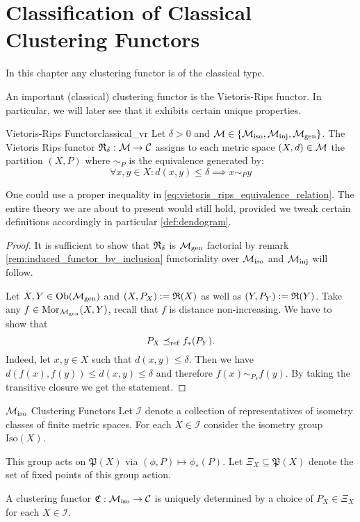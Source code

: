 \chapter{Classification of Classical Clustering Functors}
In this chapter any clustering functor is of the classical type.

An important (classical) clustering functor is the Vietoris-Rips functor.
In particular, we will later see that it exhibits certain unique properties.

\begin{defprop}{Vietoris-Rips Functor}{classical_vr}
    Let $\delta > 0$ and $\mathcal{M} \in \{{\mathcal{M}_\mathrm{iso}}, {\mathcal{M}_\mathrm{inj}}, {\mathcal{M}_\mathrm{gen}}\}$. The Vietoris Rips functor $\mathfrak{R}_\delta: \mathcal{M} \to \mathcal{C}$ assigns to each metric space $(X,d) \in \mathcal{M}$ the partition $(X,P)$ where $\sim_P$ is the equivalence generated by:
    \begin{equation}
        \label{eq:vietoris_rips_equivalence_relation}
        \forall x,y \in X: d(x,y) \leq \delta \implies x \sim_P y
    \end{equation}
\end{defprop}

One could use a proper inequality in \eqref{eq:vietoris_rips_equivalence_relation}. The entire theory we are about to present would still hold, provided we tweak certain definitions accordingly in particular \ref{def:dendogram}.

\begin{proof}
It is sufficient to show that $\mathfrak{R}_\delta$ is ${\mathcal{M}_\mathrm{gen}}$ factorial by remark \ref{rem:induced_functor_by_inclusion} functoriality over ${\mathcal{M}_\mathrm{iso}}$ and ${\mathcal{M}_\mathrm{inj}}$ will follow.

Let $X,Y \in \mathrm {Ob}({\mathcal{M}_\mathrm{gen}})$ and $(X,P_X) := \mathfrak{R}(X)$ as well as $(Y,P_Y) := \mathfrak{R}(Y)$.
Take any $f \in \mathrm {Mor}_{\mathcal{M}_\mathrm{gen}}(X,Y)$, recall that $f$ is distance non-increasing.
We have to show that 
$$P_X \preceq_\mathrm{ref} f_*(P_Y).$$
Indeed, let $x,y \in X$ such that $d(x,y) \leq \delta$.
Then we have $d(f(x), f(y)) \leq d(x,y) \leq \delta$ and therefore $f(x) \sim_{P_Y} f(y)$.
By taking the transitive closure we get the statement.
\end{proof}

\begin{myremark}{${\mathcal{M}_\mathrm{iso}}$ Clustering Functors \cite{Carlsson2010}}{}
Let $\mathcal{I}$ denote a collection of representatives of isometry classes of finite metric spaces.
For each $X \in \mathcal{I}$ consider the isometry group $\mathrm{Iso}(X)$. \par

\medskip This group acts on $\mathfrak{P}(X)$ via $(\phi, P) \mapsto \phi_*(P)$.
Let $\Xi_X \subseteq \mathfrak{P}(X)$ denote the set of fixed points of this group action. \par

\medskip A clustering functor $\mathfrak{C}: {\mathcal{M}_\mathrm{iso}} \to \mathcal{C}$ is uniquely determined by a choice of $P_X \in \Xi_X$ for each $X \in \mathcal{I}$.
\end{myremark}

